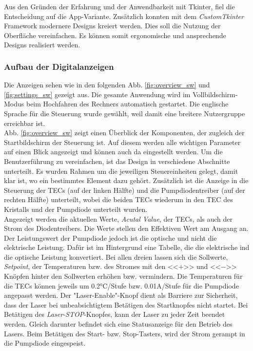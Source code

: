 Aus den Gründen der Erfahrung und der Anwendbarkeit mit Tkinter, fiel die Entscheidung auf die App-Variante. Zusätzlich konnten mit dem \textit{CustomTkinter} Framework modernere Designs kreiert werden. Dies soll die Nutzung der Oberfläche vereinfachen. Es können somit ergonomische und ansprechende Designs realisiert werden.

\subsubsection{Aufbau der Digitalanzeigen}
Die Anzeigen sehen wie in den folgenden Abb. \ref{fig:overview_sw} und \ref{fig:settings_sw} gezeigt aus. Die gesamte Anwendung wird im Vollbildschirm-Modus beim Hochfahren des Rechners automatisch gestartet. Die englische Sprache für die Steuerung wurde gewählt, weil damit eine breitere Nutzergruppe erreichbar ist.\\
Abb. \ref{fig:overview_sw} zeigt einen Überblick der Komponenten, der zugleich der Startbildschirm der Steuerung ist. Auf diesem werden alle wichtigen Parameter auf einen Blick angezeigt und können auch da eingestellt werden. Um die Benutzerführung zu vereinfachen, ist das Design in verschiedene Abschnitte unterteilt.
Es wurden Rahmen um die jeweiligen Steuereinheiten gelegt, damit klar ist, wo ein bestimmtes Element dazu gehört. Zusätzlich ist die Anzeige in die Steuerung der TECs (auf der linken Hälfte) und die Pumpdiodentreiber (auf der rechten Hälfte) unterteilt, wobei die beiden TECs wiederum in den TEC des Kristalls und der Pumpdiode unterteilt wurden.\\
Angezeigt werden die aktuellen Werte, \textit{Acutal Value}, der TECs, als auch der Strom des Diodentreibers. Die Werte stellen den Effektiven Wert am Ausgang an. Der Leistungswert der Pumpdiode jedoch ist die optische und nicht die elektrische Leistung. Dafür ist im Hintergrund eine Tabelle, die die elektrische ind die optische Leistung konvertiert.
Bei allen dreien lassen sich die Sollwerte, \textit{Setpoint}, der Temperaturen bzw. des Stromes mit den <<$+$>> und <<$-$>> Knöpfen hinter den Sollwerten erhöhen bzw. vermindern. Die Temperaturen für die TECs können jeweils um 0.2°C/Stufe bzw. 0.01A/Stufe für die Pumpdiode angepasst werden.
Der "Laser-Enable"-Knopf dient als Barriere zur Sicherheit, dass der Laser bei unbeabsichtigtem Betätigen des Startknopfes nicht startet. Bei Betätigen des \textit{Laser-STOP}-Knopfes, kann der Laser zu jeder Zeit beendet werden. Gleich darunter befindet sich eine Statusanzeige für den Betrieb des Lasers. Beim Betätigen des Start- bzw. Stop-Tasters, wird der Strom gerampt in die Pumpdiode eingespeist.\\

